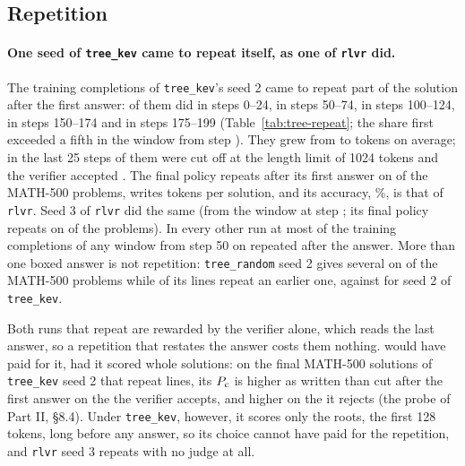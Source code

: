 \subsection{Repetition}\label{sec:res-tree-repeat}

\paragraph{One seed of \texttt{tree\_kev} came to repeat itself, as one of \texttt{rlvr} did.} The training completions
of \texttt{tree\_kev}'s seed 2 came to repeat part of the solution after the first answer: 
of them did in steps 0--24,  in steps 50--74,  in steps
100--124,  in steps 150--174 and  in steps 175--199
(Table~\ref{tab:tree-repeat}; the share first exceeded a fifth in the window from step ). They
grew from  to  tokens on average; in the last 25 steps
 of them were cut off at the length limit of 1024 tokens and the verifier accepted
. The final policy repeats after its first answer on  of the
MATH-500 problems, writes  tokens per solution, and its accuracy, \%, is
that of \texttt{rlvr}. Seed 3 of \texttt{rlvr} did the same (from the window at step ; its final
policy repeats on  of the problems). In every other run at most  of the
training completions of any window from step 50 on repeated after the answer. More than
one boxed answer is not repetition: \texttt{tree\_random} seed 2 gives several on  of the
MATH-500 problems while  of its lines repeat an earlier one, against  for
seed 2 of \texttt{tree\_kev}.

Both runs that repeat are rewarded by the verifier alone, which reads the last answer, so a repetition that restates
the answer costs them nothing. \kev{} would have paid for it, had it scored whole solutions: on the final MATH-500
solutions of \texttt{tree\_kev} seed 2 that repeat lines, its $P_{\mathrm{c}}$ is 
 higher as written than cut after the first answer on the
 the verifier accepts, and 
 higher on the  it rejects (the probe
of Part II, \S8.4). Under \texttt{tree\_kev}, however, it scores only the roots, the first 128 tokens, long before any
answer, so its choice cannot have paid for the repetition, and \texttt{rlvr} seed 3 repeats with no judge at all.

